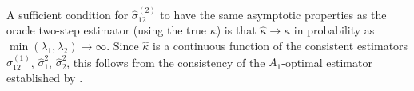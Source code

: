 \begin{remark}
A sufficient condition for $\hat{\sigma}_{12}^{(2)}$ to have the
same asymptotic properties as the oracle two-step estimator
(using the true $\kappa$) is that $\hat\kappa \to \kappa$ in
probability as $\min(\lambda_1, \lambda_2) \to \infty$.
Since $\hat\kappa$ is a continuous function of the consistent
estimators $\hat\sigma_{12}^{(1)}$, $\hat\sigma_1^2$,
$\hat\sigma_2^2$, this follows from the consistency of the
$A_1$-optimal estimator established by
\citet{hayashi2005covariance}.
\end{remark}
